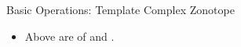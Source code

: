 \begin{frame}{Basic Operations: Template Complex Zonotope}
%
\begin{enumerate}
\end{enumerate}
%
\begin{itemize}
\item Above are  of 
and .
\end{itemize}
%
\end{frame}



